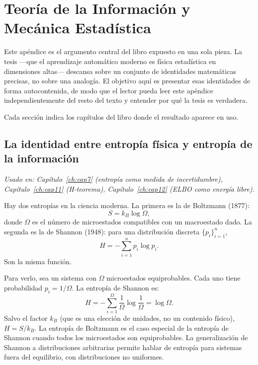 \chapter{Teoría de la Información y Mecánica Estadística}
\label{ap:info_mecanica}

Este apéndice es el argumento central del libro expuesto en una sola pieza.
La tesis —que el aprendizaje automático moderno es física estadística en
dimensiones altas— descansa sobre un conjunto de identidades matemáticas
precisas, no sobre una analogía. El objetivo aquí es presentar esas identidades
de forma autocontenida, de modo que el lector pueda leer este apéndice
independientemente del resto del texto y entender por qué la tesis es verdadera.

Cada sección indica los capítulos del libro donde el resultado aparece en uso.

\section{La identidad entre entropía física y entropía de la información}
\label{sec:ap_entropia}

\textit{Usado en: Capítulo~\ref{ch:cap7} (entropía como medida de incertidumbre),
Capítulo~\ref{ch:cap11} (H-teorema), Capítulo~\ref{ch:cap12} (ELBO como
energía libre).}

\medskip
Hay dos entropías en la ciencia moderna. La primera es la de Boltzmann (1877):
\begin{equation}
  S = k_B\log\Omega,
  \label{eq:ap_boltzmann}
\end{equation}
donde $\Omega$ es el número de microestados compatibles con un macroestado dado.
La segunda es la de Shannon (1948): para una distribución discreta
$\{p_i\}_{i=1}^n$,
\begin{equation}
  H = -\sum_{i=1}^n p_i\log p_i.
  \label{eq:ap_shannon}
\end{equation}
Son la misma función.

Para verlo, sea un sistema con $\Omega$ microestados equiprobables. Cada uno
tiene probabilidad $p_i = 1/\Omega$. La entropía de Shannon es:
\[
  H = -\sum_{i=1}^\Omega \frac{1}{\Omega}\log\frac{1}{\Omega} = \log\Omega.
\]
Salvo el factor $k_B$ (que es una elección de unidades, no un contenido físico),
$H = S/k_B$. La entropía de Boltzmann es el caso especial de la entropía de
Shannon cuando todos los microestados son equiprobables. La generalización de
Shannon a distribuciones arbitrarias permite hablar de entropía para sistemas
fuera del equilibrio, con distribuciones no uniformes.

